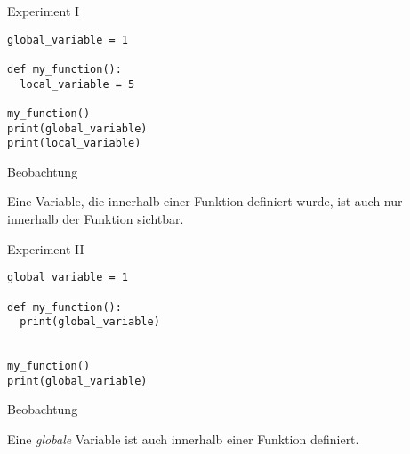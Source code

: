 \begin{fragile}
	
\begin{block}{Experiment I}
\vspace{2pt}

\begin{verbatim}
global_variable = 1

def my_function(): 
  local_variable = 5

my_function()
print(global_variable)
print(local_variable)
\end{verbatim}


\vspace{12pt}

\end{block}

\begin{exampleblock}{Beobachtung}

\pause 

Eine Variable, die innerhalb einer Funktion definiert wurde, ist auch nur innerhalb der Funktion sichtbar. 
\end{exampleblock}


\end{fragile}

\begin{fragile}
	
\begin{block}{Experiment II}
\vspace{2pt}

\begin{verbatim}
global_variable = 1

def my_function(): 
  print(global_variable)
 

my_function()
print(global_variable)
\end{verbatim}


\vspace{12pt}

\end{block}

\begin{exampleblock}{Beobachtung}

\pause 

Eine \emph{globale} Variable ist auch innerhalb einer Funktion definiert.  
\end{exampleblock}

	
\end{fragile}

